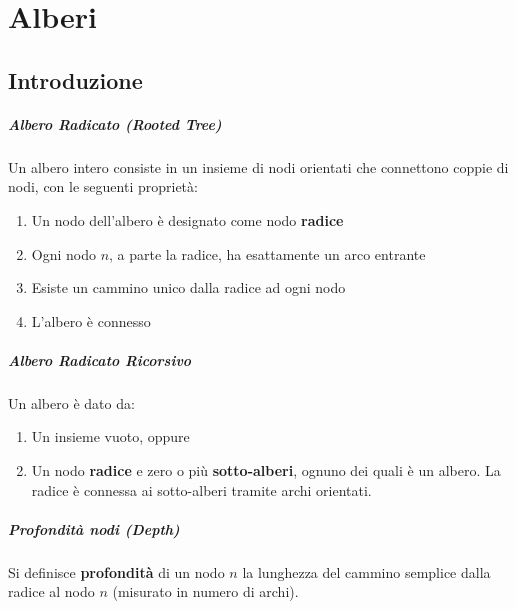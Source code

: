 \chapter{Alberi}
\thispagestyle{chapterInit}
\section{Introduzione}
    \paragraph{Albero Radicato (\textit{Rooted Tree})}
        \begin{definition}
            Un albero intero consiste in un insieme di nodi orientati che connettono coppie di nodi, con le seguenti proprietà:
            \begin{enumerate}
                \item Un nodo dell'albero è designato come nodo \textbf{radice}
                \item Ogni nodo $ n $, a parte la radice, ha esattamente un arco entrante
                \item Esiste un cammino unico dalla radice ad ogni nodo
                \item L'albero è connesso
            \end{enumerate}
        \end{definition}
    \paragraph{Albero Radicato Ricorsivo}
        \begin{definition}
            Un albero è dato da:
            \begin{enumerate}
                \item Un insieme vuoto, oppure
                \item Un nodo \textbf{radice} e zero o più \textbf{sotto-alberi}, ognuno dei quali è un albero.
                    \subitem La radice è connessa ai sotto-alberi tramite archi orientati.
            \end{enumerate}
        \end{definition}
    \paragraph{Profondità nodi (\textit{Depth})}
        \begin{definition}
            Si definisce \textbf{profondità} di un nodo $ n $ la lunghezza del cammino semplice dalla radice al nodo $ n $ (misurato in numero di archi).
        \end{definition}
